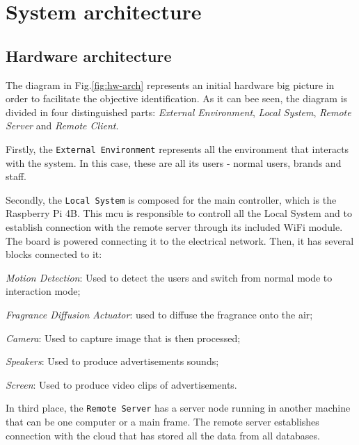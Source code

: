 
\section{System architecture}
\label{sec:system-architecture}

\subsection{Hardware architecture}
\label{sec:hardw-arch}
%
The diagram in Fig.\ref{fig:hw-arch} represents an initial hardware big picture in order to facilitate the objective identification.
As it can bee seen, the diagram is divided in four distinguished parts: \emph{External Environment}, \emph{Local System}, \emph{Remote Server} and \emph{Remote Client}.

Firstly, the \texttt{External Environment} represents all the environment that interacts with the system. In this case, these are all its users - normal users, brands and staff.

Secondly, the \texttt{Local System} is composed for the main controller, which is the Raspberry Pi 4B. 
This \gls{mcu} is responsible to controll all the Local System and to establish connection with the remote server through its included WiFi module. 
The board is powered connecting it to the electrical network. 
Then, it has several blocks connected to it:
%
\begin{item-c}
\item \emph{Motion Detection}: Used to detect the users and switch from normal mode to interaction mode;
\item \emph{Fragrance Diffusion Actuator}: used to diffuse the fragrance onto the air;
\item \emph{Camera}: Used to capture image that is then processed;
\item \emph{Speakers}: Used to produce advertisements sounds;
\item \emph{Screen}: Used to produce video clips of advertisements.
\end{item-c}
%

In third place, the \texttt{Remote Server} has a server node running in another machine that can be one computer or a main frame.
The remote server establishes connection with the cloud that has stored all the data from all databases.


